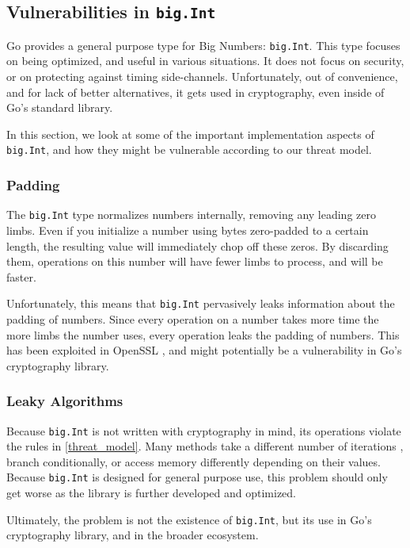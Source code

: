 \documentclass[11pt, a4paper]{article} %
\begin{document}
{\subsection{Vulnerabilities in \texttt{big.Int}}

Go provides a general purpose type for Big Numbers: \texttt{big.Int}.
This type focuses on being optimized, and useful in various
situations. It does not focus on security, or on protecting
against timing side-channels.
Unfortunately, out of convenience,
and for lack of better alternatives, it gets used in
cryptography, even inside of Go's standard library.

In this section, we look at some of the important implementation aspects
of \texttt{big.Int}, and how they might be vulnerable
according to our threat model.

\subsubsection{Padding}

The \texttt{big.Int} type normalizes numbers internally,
removing any leading zero limbs. Even if you initialize a number
using bytes zero-padded to a certain length, the resulting value
will immediately chop off these zeros.
By discarding them, operations on
this number will have fewer limbs to process, and will be faster.

Unfortunately, this means that \texttt{big.Int} pervasively leaks information
about the padding of numbers. Since every operation on
a number takes more time the more limbs the number uses,
every operation leaks the padding of numbers.
This has been exploited
in OpenSSL \cite{merget_raccoon_2019}, and might potentially
be a vulnerability in Go's cryptography library.

\subsubsection{Leaky Algorithms}

Because \texttt{big.Int} is not written with cryptography in mind,
its operations violate the rules in
\ref{threat_model}. Many methods take a different number of iterations
, branch conditionally, or
access memory differently
depending on their values. Because \texttt{big.Int}
is designed for general purpose use, this problem should only get worse
as the library is further developed and optimized.

Ultimately, the problem is not the existence of \texttt{big.Int},
but its use in Go's cryptography library, and in the broader ecosystem.

}
\end{document}
